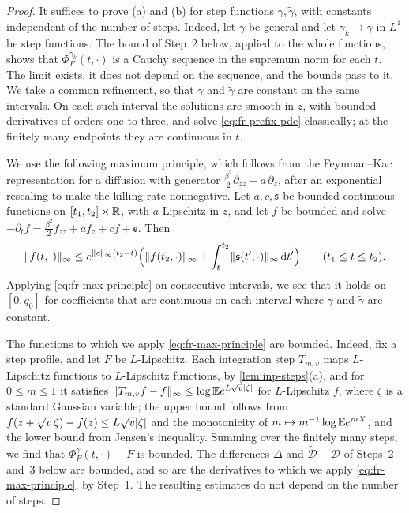 \begin{proof}
It suffices to prove (a) and (b) for step functions $\gamma,\widetilde\gamma$, with constants independent of the number of steps. Indeed, let $\gamma$ be general and let $\gamma_k\to\gamma$ in $L^1$ be step functions. The bound of Step~2 below, applied to the whole functions, shows that $\Phi^{\gamma_k}_F(t,\cdot)$ is a Cauchy sequence in the supremum norm for each $t$. The limit exists, it does not depend on the sequence, and the bounds pass to it. We take a common refinement, so that $\gamma$ and $\widetilde\gamma$ are constant on the same intervals. On each such interval the solutions are smooth in $z$, with bounded derivatives of orders one to three, and solve \eqref{eq:fr-prefix-pde} classically; at the finitely many endpoints they are continuous in $t$.

We use the following maximum principle, which follows from the Feynman--Kac representation \cite[Theorem~5.7.6]{karatzas-shreve-1991} for a diffusion with generator $\frac{\beta^2}2\partial_{zz}+a\,\partial_z$, after an exponential rescaling to make the killing rate nonnegative. Let $a,c,\mathfrak s$ be bounded continuous functions on $[t_1,t_2]\times\mathbb R$, with $a$ Lipschitz in $z$, and let $f$ be bounded and solve $-\partial_tf=\frac{\beta^2}2f_{zz}+af_z+cf+\mathfrak s$. Then
\begin{equation}\label{eq:fr-max-principle}
 \lVert f(t,\cdot)\rVert_\infty\le e^{\lVert c\rVert_\infty(t_2-t)}\Bigl(\lVert f(t_2,\cdot)\rVert_\infty+\int_t^{t_2}\lVert \mathfrak s(t',\cdot)\rVert_\infty\,\mathrm d t'\Bigr)\qquad(t_1\le t\le t_2).
\end{equation}
Applying \eqref{eq:fr-max-principle} on consecutive intervals, we see that it holds on $[0,q_0]$ for coefficients that are continuous on each interval where $\gamma$ and $\widetilde\gamma$ are constant.

The functions to which we apply \eqref{eq:fr-max-principle} are bounded. Indeed, fix a step profile, and let $F$ be $L$-Lipschitz. Each integration step $T_{m,v}$ maps $L$-Lipschitz functions to $L$-Lipschitz functions, by \cref{lem:inp-steps}(a), and for $0\le m\le1$ it satisfies $\lVert T_{m,v}f-f\rVert_\infty\le\log\mathbb E e^{L\sqrt v\lvert \zeta\rvert}$ for $L$-Lipschitz $f$, where $\zeta$ is a standard Gaussian variable; the upper bound follows from $f(z+\sqrt v\,\zeta)-f(z)\le L\sqrt v\lvert \zeta\rvert$ and the monotonicity of $m\mapsto m^{-1}\log\mathbb E e^{mX}$, and the lower bound from Jensen's inequality. Summing over the finitely many steps, we find that $\Phi^\gamma_F(t,\cdot)-F$ is bounded. The differences $\Delta$ and $\widetilde{\mathcal D}-\mathcal D$ of Steps~2 and~3 below are bounded, and so are the derivatives to which we apply \eqref{eq:fr-max-principle}, by Step~1. The resulting estimates do not depend on the number of steps.


\end{proof}
